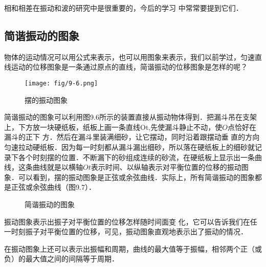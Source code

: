 相和相差在振动和波的研究中是很重要的，今后的学习
中常常要提到它们．

\subsection{简谐振动的图象}
物体的运动情况可以用公式来表示，也可以用图象来表示，我们以前学过，匀速直线运动的位移图象是一条通过原点的直线，简谐振动的位移图象是怎样的呢？
\begin{figure}[htp]\centering
    \texttt{[image: fig/9-6.png]}
    \caption{摆的振动图象}
    \end{figure}

简谐振动的图象可以利用图9.6所示的装置直接从振动物体得到．把漏斗吊在支架上，下方放一块硬纸板，纸板上画一条直线Ot,先使漏斗静止不动，使$O$点恰好在漏斗的正下
方．然后在漏斗里装满细砂，让它摆动，同时沿着跟摆动垂
直的方向匀速拉动硬纸板．因为每一时刻都从漏斗漏出细砂，所以落在硬纸板上的细砂就记录下各个时刻摆的位置．不断漏下的砂组成连续的砂流，在硬纸板上显示出一条曲线，这条曲线就是以横轴$Ot$表示时间、以纵轴表示对平衡位置的位移的振动图象．可以看到，摆的振动图象是正弦或余弦曲线．实际上，所有简谐振动的图象都是正弦或余弦曲线（图9.7）．
\begin{figure}\centering
    \caption{简谐振动的图象}
\end{figure}

振动图象表示出振子对平衡位置的位移怎样随时间面变
化，它可以告诉我们在任一时刻振子对平衡位置的位移，可见，振动图象直观地表示出了振动的情况．

在振动图象上还可以表示出振幅和周期，曲线的最大值等于振幅，相邻两个正（或负）的最大值之间的间隔等于周期．

